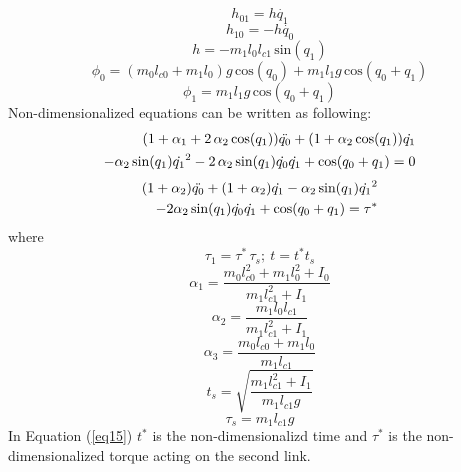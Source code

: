 \documentclass[conference]{IEEEtran}
\begin{document}
\begin{equation}\label{eq8}
    h_{01} = h\dot{q_1}
\end{equation}
\begin{equation}\label{eq9}
    h_{10} = -h\dot{q_0}
\end{equation}
\begin{equation}\label{eq10}
    h = -m_1l_0l_{c1}\,\text{sin}(q_1)
\end{equation}
\begin{equation}\label{eq11}
    \phi_{0} = (m_0l_{c0}+m_1l_0)g\,\text{cos}(q_0) + m_1l_1g\,\text{cos}(q_0+q_1)
\end{equation}
\begin{equation}\label{eq12}
    \phi_{1} = m_1l_1g\,\text{cos}(q_0+q_1)
\end{equation}
Non-dimensionalized equations can be written as following:
\begin{equation}\label{eq13}
    \begin{split}
        (1 + \alpha_1 + 2\,\alpha_2\,\text{cos}(q_1))\Ddot{q_0} + (1+\alpha_2\,\text{cos}(q_1))\dot{q_1}\\
        - \alpha_2\,\text{sin}(q_1)\dot{q_1}^2 - 2\,\alpha_2\,\text{sin}(q_1)\dot{q_0}\dot{q_1} + \text{cos}(q_0+q_1) = 0
    \end{split}
\end{equation}
\begin{equation}\label{eq14}
    \begin{split}
        (1 + \alpha_2)\Ddot{q_0} + (1+\alpha_2)\dot{q_1} - \alpha_2\,\text{sin}(q_1)\dot{q_1}^2\\
        - 2\alpha_2\,\text{sin}(q_1)\dot{q_0}\dot{q_1} + \text{cos}(q_0+q_1) = \tau^*
    \end{split}
\end{equation}
where
\begin{equation}\label{eq15}
    \tau_1 = \tau^{*}\,\tau_s;~t=t^{*}t_s
\end{equation}
\begin{equation}\label{eq16}
    \alpha_1 = \frac{m_0l_{c0}^{2} + m_1l_0^2 + I_0}{m_1l_{c1}^{2} + I_1}
\end{equation}
\begin{equation}\label{eq17}
    \alpha_2 = \frac{m_1l_0l_{c1}}{m_1l_{c1}^{2} + I_1}
\end{equation}
\begin{equation}\label{eq18}
    \alpha_3 = \frac{m_0l_{c0} + m_1l_0}{m_1l_{c1}}
\end{equation}
\begin{equation}\label{eq19}
    t_s = \sqrt{\frac{m_1l_{c1}^{2} + I_1}{m_1l_{c1}g}}
\end{equation}
\begin{equation}\label{eq20}
    \tau_s = m_1l_{c1}g
\end{equation}
In Equation (\ref{eq15}) \(t^*\) is the non-dimensionalizd time and \(\tau^*\) is the non-dimensionalized torque acting on the second link.
\end{document}
